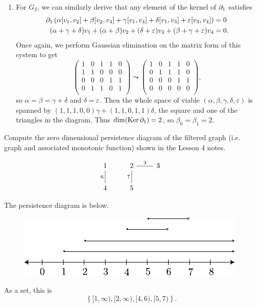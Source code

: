 \documentclass[twoside,10pt]{article}
\begin{document}
\begin{enumerate}
	\item For $G_2$, we can similarly derive that any element of the kernel of $\partial_1$ satisfies
		\begin{align*}
			\partial_1\left( \alpha[v_1,v_2]+\beta[v_2,v_4]+\gamma[v_1,v_4]+\delta[v_1,v_3]+\varepsilon[v_3,v_4] \right) &= 0 \\
			(\alpha+\gamma+\delta)v_1+(\alpha+\beta)v_2+(\delta+\varepsilon)v_3+(\beta+\gamma+\varepsilon)v_4 &= 0.
		\end{align*}
		Once again, we perform Gaussian elimination on the matrix form of this system to get
	\[
                \begin{pmatrix}
                        1 & 0 & 1 & 1 & 0 \\
                        1 & 1 & 0 & 0 & 0 \\
                        0 & 0 & 0 & 1 & 1 \\
                        0 & 1 & 1 & 0 & 1 \\
                \end{pmatrix}
                \leadsto
                \begin{pmatrix}
                        1 & 0 & 1 & 1 & 0 \\
                        0 & 1 & 1 & 1 & 0 \\
                        0 & 0 & 0 & 1 & 1 \\
                        0 & 0 & 0 & 0 & 0 \\
		\end{pmatrix},
	\] so $\alpha=\beta=\gamma+\delta$ and $\delta=\varepsilon$. Then the whole space of viable $(\alpha,\beta,\gamma,\delta,\varepsilon)$ is spanned by $(1,1,1,0,0)\gamma + (1,1,0,1,1)\delta$, the square and one of the triangles in the diagram. Thus $\dim (\operatorname{Ker} \partial_1) = 2$, so $\beta_0=\beta_1=2$.
\end{enumerate}




\newpage

\begin{exer}
	Compute the zero dimensional persistence diagram of the filtered graph (i.e. graph and associated monotonic function) shown in the Lesson 4 notes.
\end{exer}

\[
\begin{tikzcd}
1 \arrow[d, "6"', no head] & 2 \arrow[r, "3", no head] \arrow[d, "7"', no head] & 3 \\
4                          & 5                                                  &  
\end{tikzcd}
\] 

The persistence diagram is below.
\begin{figure}[H]
	\centering
	\includegraphics[scale=1]{fig/persistent.pdf}
\end{figure}
As a set, this is
\[
	\left\{ [1,\infty), [2,\infty), [4,6), [5,7) \right\}.
\] 
\end{document}
